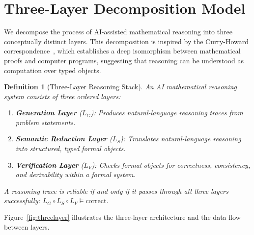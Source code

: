 \documentclass[11pt,a4paper]{article}
\newtheorem{definition}{Definition}
\begin{document}
\section{Three-Layer Decomposition Model}
\label{sec:threelayer}

We decompose the process of AI-assisted mathematical reasoning into three conceptually distinct layers. This decomposition is inspired by the Curry-Howard correspondence~\cite{howard1980formulae}, which establishes a deep isomorphism between mathematical proofs and computer programs, suggesting that reasoning can be understood as computation over typed objects.

\begin{definition}[Three-Layer Reasoning Stack]
An AI mathematical reasoning system consists of three ordered layers:
\begin{enumerate}
    \item \textbf{Generation Layer} ($L_G$): Produces natural-language reasoning traces from problem statements.
    \item \textbf{Semantic Reduction Layer} ($L_S$): Translates natural-language reasoning into structured, typed formal objects.
    \item \textbf{Verification Layer} ($L_V$): Checks formal objects for correctness, consistency, and derivability within a formal system.
\end{enumerate}
A reasoning trace is \textit{reliable} if and only if it passes through all three layers successfully: $L_G \circ L_S \circ L_V \models \text{correct}$.
\end{definition}

Figure~\ref{fig:threelayer} illustrates the three-layer architecture and the data flow between layers.
\end{document}
